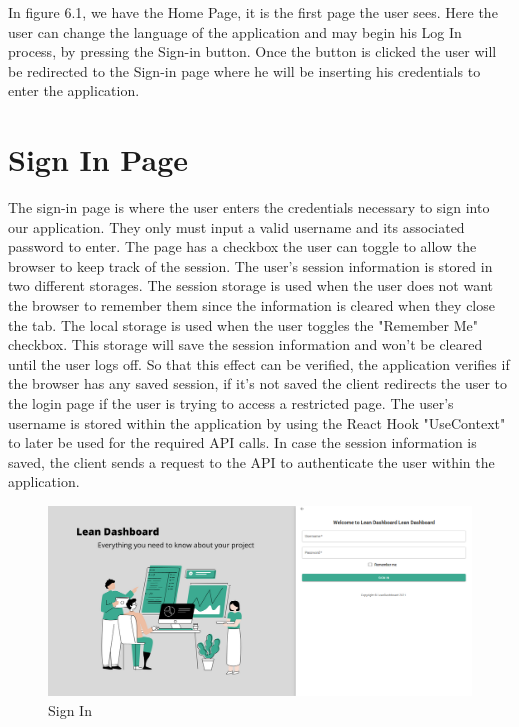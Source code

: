 \documentclass[a4paper,twoside,10pt]{report}
\begin{document}
In figure 6.1, we have the Home Page, it is the first page the user sees. Here the user can change the language of the application and may begin his Log In process, by pressing the Sign-in button. Once the button is clicked the user will be redirected to the Sign-in page where he will be inserting his credentials to enter the application.


\section{Sign In Page}
The sign-in page is where the user enters the credentials necessary to sign into our application.
They only must input a valid username and its associated password to enter.
\newline
The page has a checkbox the user can toggle to allow the browser to keep track of the session. 
The user's session information is stored in two different storages.
\newline
The session storage is used when the user does not want the browser to remember them since the information is cleared when they close the tab.
\newline
The local storage is used when the user toggles the "Remember Me" checkbox. This storage will save the session information and won't be cleared until the user logs off.
So that this effect can be verified, the application verifies if the browser has any saved session, if it's not saved the client redirects the user to the login page if the user is trying to access a restricted page.
\newline
The user's username is stored within the application by using the React Hook "UseContext" to later be used for the required API calls.
In case the session information is saved, the client sends a request to the API to authenticate the user within the application.

\begin{figure}[h!]
\center
  \includegraphics[width=\textwidth]{SignIn.png}
\caption{Sign In}
\end{figure}
\end{document}
